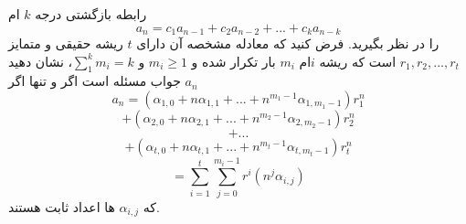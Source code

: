 \EXERCISE
{}
رابطه‌ بازگشتی درجه 
$k$
ام
\[a_n=c_{1}a_{n-1}+c_{2}a_{n-2}+...+c_{k}a_{n-k}\]
را در نظر بگیرید. فرض کنید که معادله مشخصه آن دارای 
$t$
ریشه حقیقی و متمایز 
$r_1, r_2, ..., r_t $
است که ریشه
$i$ام 
$m_i$
بار تکرار شده و  
$m_i \geq 1$
و
$\sum_1^k m_i=k$،
نشان دهید
$a_n$
جواب مسئله است اگر و تنها اگر
\[a_n=(\alpha_{1,0}+ n\alpha_{1,1} + ... + n^{m_1-1}\alpha_{1,m_1-1})r_1^n\]
\[+(\alpha_{2,0}+ n\alpha_{2,1} + ... + n^{m_2-1}\alpha_{2,m_2-1})r_2^n\]
\[+...\]
\[+ (\alpha_{t,0} + n\alpha_{t,1} + ... + n^{m_t-1}\alpha_{t,m_t-1})r_t^n\]
\[=\sum_{i=1}^t\sum_{j=0}^{m_i-1}r^i(n^j\alpha_{i,j})\]
که
$\alpha_{i,j}$
ها
اعداد ثابت هستند.


